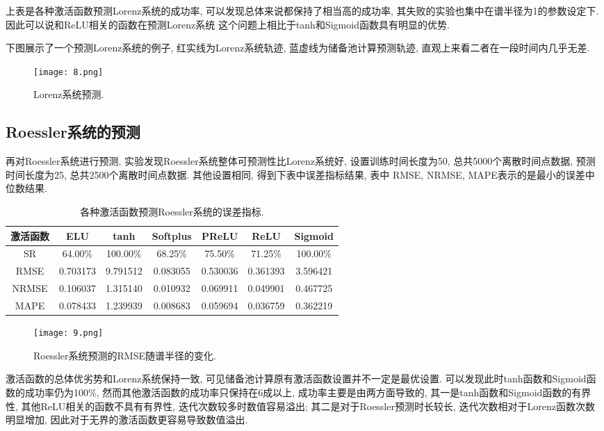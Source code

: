 \documentclass[notitlepage,cs4size,punct,oneside]{ctexrep}
\numberwithin{equation}{chapter}
\theoremstyle{mystyle}
\begin{document}
上表是各种激活函数预测Lorenz系统的成功率, 可以发现总体来说都保持了相当高的成功率, 
其失败的实验也集中在谱半径为1的参数设定下. 因此可以说和ReLU相关的函数在预测Lorenz系统
这个问题上相比于tanh和Sigmoid函数具有明显的优势. 

下图展示了一个预测Lorenz系统的例子, 红实线为Lorenz系统轨迹, 蓝虚线为储备池计算预测轨迹, 
直观上来看二者在一段时间内几乎无差. 
\begin{figure}[htbp]
    \centering
    \texttt{[image: 8.png]}
    \caption{Lorenz系统预测.}
\end{figure}

\subsection{Roessler系统的预测}
再对Roessler系统进行预测, 实验发现Roessler系统整体可预测性比Lorenz系统好, 
设置训练时间长度为50, 总共5000个离散时间点数据, 
预测时间长度为25, 总共2500个离散时间点数据. 其他设置相同, 得到下表中误差指标结果, 表中
RMSE, NRMSE, MAPE表示的是最小的误差中位数结果.  

\begin{table}[htbp]\centering
    \caption{各种激活函数预测Roessler系统的误差指标.}
    \begin{tabular}{ccccccc}
    \hline\hline
    激活函数 & ELU & tanh & Softplus & PReLU & ReLU & Sigmoid \\
    \hline
    SR   & 64.00\% & 100.00\% & 68.25\% & 75.50\% & 71.25\% & 100.00\% \\
    RMSE   & 0.703173 & 9.791512 & 0.083055 & 0.530036 & 0.361393 & 3.596421 \\
    NRMSE   & 0.106037 & 1.315140 & 0.010932 & 0.069911 & 0.049901 & 0.467725 \\
    MAPE   & 0.078433& 1.239939 & 0.008683 & 0.059694 & 0.036759 & 0.362219 \\
    \hline\hline
    \end{tabular}
\end{table}

\begin{figure}[htbp]
    \centering
    \texttt{[image: 9.png]}
    \caption{Roessler系统预测的RMSE随谱半径的变化.}
\end{figure}

激活函数的总体优劣势和Lorenz系统保持一致, 可见储备池计算原有激活函数设置并不一定是最优设置. 
可以发现此时tanh函数和Sigmoid函数的成功率仍为100\%, 然而其他激活函数的成功率只保持在6成以上, 
成功率主要是由两方面导致的, 其一是tanh函数和Sigmoid函数的有界性, 其他ReLU相关的函数不具有有界性, 
迭代次数较多时数值容易溢出; 其二是对于Roessler预测时长较长, 迭代次数相对于Lorenz函数次数明显增加, 
因此对于无界的激活函数更容易导致数值溢出. 
\end{document}
